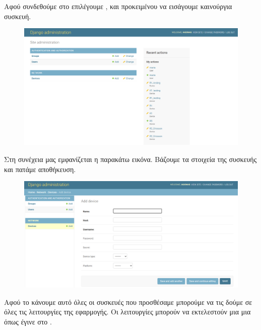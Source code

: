 \FloatBarrier

Αφού συνδεθούμε στο  επιλέγουμε ,  και  προκειμένου να εισάγουμε καινούργια συσκευή.

\FloatBarrier

\begin{figure}[h]
	\centering
	\includegraphics[width=1.1\textwidth]{graphics/DJANGO_ADMIN.png}
	\caption{}
\end{figure}

\FloatBarrier

Στη συνέχεια μας εμφανίζεται η παρακάτω εικόνα. Βάζουμε τα στοιχεία της συσκευής και πατάμε αποθήκευση.

\FloatBarrier

\begin{figure}[h]
	\centering
	\includegraphics[width=1.1\textwidth]{graphics/ADD_DEVICE.png}
	\caption{}
\end{figure}

\FloatBarrier

Αφού το κάνουμε αυτό όλες οι συσκευές που προσθέσαμε μπορούμε να τις δούμε σε όλες τις λειτουργίες της εφαρμογής.
Οι λειτουργίες μπορούν να εκτελεστούν μια μια όπως έγινε στο .

